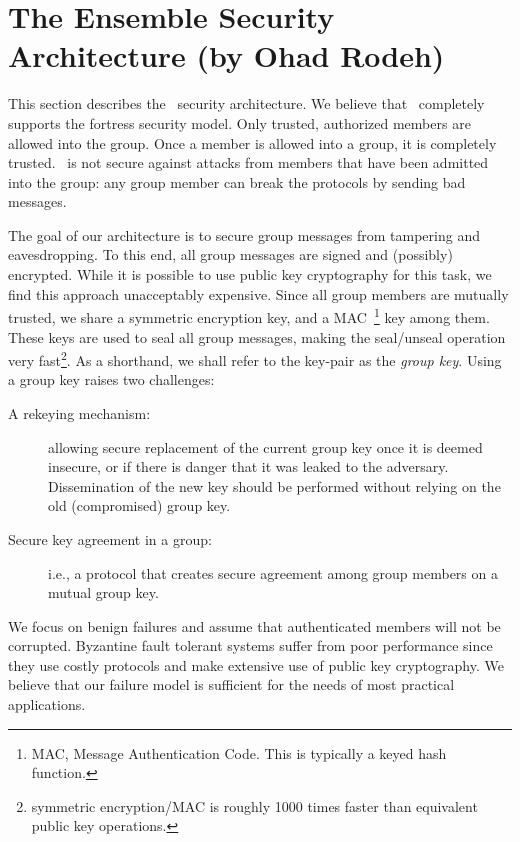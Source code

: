 \section{The Ensemble Security Architecture (by Ohad Rodeh)}
\long{}

This section describes the \ensemble\ security architecture. We
believe that \ensemble\ completely supports the fortress security
model. Only trusted, authorized members are allowed into the group.
Once a member is allowed into a group, it is completely trusted.
\ensemble\ is not secure against attacks from members that have been
admitted into the group: any group member can break the protocols by
sending bad messages.

The goal of our architecture is to secure group messages from
tampering and eavesdropping. To this end, all group messages are
signed and (possibly) encrypted. While it is possible to use public
key cryptography for this task, we find this approach unacceptably
expensive. Since all group members are mutually trusted, we share a
symmetric encryption key, and a MAC~\footnote{MAC, Message Authentication
Code. This is typically a keyed hash function.} key among them. These
keys are used to seal all group messages, making the seal/unseal
operation very fast\footnote{symmetric encryption/MAC is roughly 1000
times faster than equivalent public key operations.}. As a shorthand,
we shall refer to the key-pair as the {\it group key}. Using a group key
raises two challenges:

\begin{description}
\item[ A rekeying mechanism:] allowing secure replacement of the current
group key once it is deemed insecure, or if there is danger that it
was leaked to the adversary. Dissemination of the new key should be
performed without relying on the old (compromised) group key.

\item[Secure key agreement in a group:] i.e., a protocol that creates
secure agreement among group members on a mutual group key. 
\end{description}

We focus on benign failures and assume that authenticated members will
not be corrupted.  Byzantine fault tolerant systems suffer from
poor performance since they use costly protocols and make extensive use of
public key cryptography. We believe that our failure model is
sufficient for the needs of most practical applications.  

